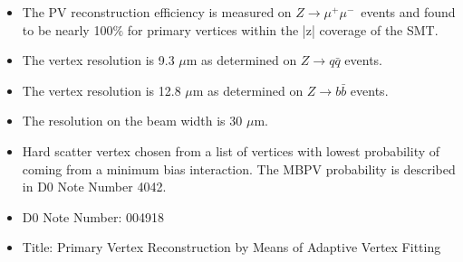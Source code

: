 \begin{itemize}
\item The PV reconstruction efficiency is measured on $Z \rightarrow \mu^{+}\mu^{-}$~events and found to be nearly 100$\%$ for primary vertices within the |z| coverage of the SMT.
\item The vertex resolution is 9.3 $\mu$m as determined on $Z \rightarrow q\bar{q}$ events.
\item The vertex resolution is 12.8 $\mu$m as determined on $Z \rightarrow b\bar{b}$ events.
\item The resolution on the beam width is 30 $\mu$m.
\item Hard scatter vertex chosen from a list of vertices with lowest probability of coming from a minimum bias interaction. The MBPV probability is described in D0 Note Number 4042.
\item D0 Note Number: 004918
\item Title: Primary Vertex Reconstruction by Means of Adaptive Vertex Fitting
\end{itemize}




